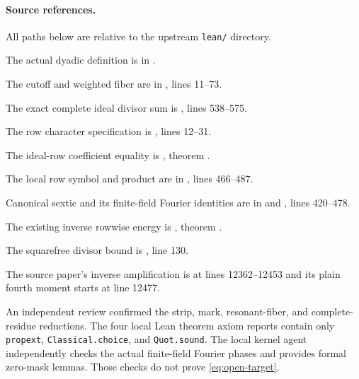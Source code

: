 \documentclass[11pt]{article}
\begin{document}
\paragraph{Source references.}
All paths below are relative to the upstream \texttt{lean/} directory.

The actual dyadic definition is in
.

The cutoff and weighted fiber are in
, lines 11--73.

The exact complete ideal divisor sum is
, lines 538--575.

The row character specification is
, lines 12--31.

The ideal-row coefficient equality is
, theorem .

The local row symbol and product are in
, lines 466--487.

Canonical sextic and its finite-field Fourier identities are in
 and
, lines 420--478.

The existing inverse rowwise energy is
,
theorem .

The squarefree divisor bound is
, line 130.

The source paper's inverse amplification is at lines 12362--12453
and its plain fourth moment starts at line 12477.

An independent review confirmed the strip, mark, resonant-fiber, and
complete-residue reductions. The four local Lean theorem axiom reports
contain only \texttt{propext}, \texttt{Classical.choice}, and
\texttt{Quot.sound}.
The local kernel agent independently checks the actual finite-field
Fourier phases and provides formal zero-mask lemmas. Those checks do not
prove \eqref{eq:open-target}.
\end{document}
